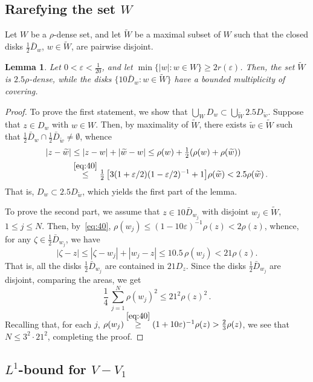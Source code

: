 \documentclass[11pt]{amsart}
\numberwithin{equation}{section}
\newtheorem{lemma}{Lemma}[section]
\def\ep{{\varepsilon}}
\begin{document}
\subsection{Rarefying the set $W$}\label{subsect:rarefying}

Let $W$ be a $\rho$-dense set, and let
$\widetilde W$ be a maximal subset of $W$ such that the closed disks
$\tfrac12\bar D_w$, $w\in\widetilde W$, are pairwise disjoint.

\begin{lemma}\label{lemmaB}
Let $0<\ep<\tfrac1{20}$, and let $\min\{|w|\colon w\in W\}\ge 2r(\ep)$.
Then, the set $\widetilde W$ is $2.5\rho$-dense,
while the disks $\{10\bar D_w\colon w\in\widetilde W\}$
have a bounded multiplicity of covering.
\end{lemma}

\begin{proof}
To prove the first statement, we show that
$ \bigcup_{W} D_w \subset\bigcup_{\widetilde W}2.5D_{\widetilde w} $.
Suppose that $z\in D_w$ with $w\in W$.
Then, by maximality of $\widetilde W$,
there exists $\widetilde w\in \widetilde W$ such that
$ \tfrac12 \bar D_w \cap \tfrac12 \bar D_{\widetilde w} \ne \emptyset$, whence
\begin{align*}
|z-\widetilde w| &\le |z-w|+|\widetilde w  - w|
\le \rho (w) + \tfrac12 (\rho(w) + \rho(\widetilde w)) \\
&\stackrel{\eqref{eq:40}}\le \tfrac12\, \bigl[ 3(1+\ep/2)(1-\ep/2)^{-1} + 1 \bigr] \rho(\widetilde w)
< 2.5\rho(\widetilde w)\,.
\end{align*}
That is, $D_w\subset 2.5D_{\widetilde w}$, which yields the
first part of the lemma.

To prove the second part, we assume that $z\in 10\bar D_{w_j}$ with disjoint
$w_j\in\widetilde W$, $1\le j \le N$. Then, by~\eqref{eq:40},
$\rho(w_j) \le (1-10\ep)^{-1}\rho(z) < 2\rho(z)$, whence, for any $\zeta\in\tfrac12\bar D_{w_j}$,
we have
\[
|\zeta - z| \le |\zeta-w_j| + |w_j-z| \le 10.5\, \rho(w_j)<21\rho(z).
\]
That is, all the disks
$\tfrac12 \bar D_{w_j}$ are contained in $21D_z$. Since the disks $\tfrac12 \bar D_{w_j}$
are disjoint, comparing the areas, we get
\[
\frac14\, \sum_{j=1}^N \rho(w_j)^2 \le 21^2 \rho(z)^2\,.
\]
Recalling that, for each $j$, $\rho(w_j) \stackrel{\eqref{eq:40}}\ge (1+10\ep)^{-1}\rho(z) > \tfrac23 \rho(z)$,
we see that $N\le 3^2 \cdot 21^2$, completing the proof. 
\end{proof}

\subsection{$L^1$-bound for $V-V_1$}
\end{document}
